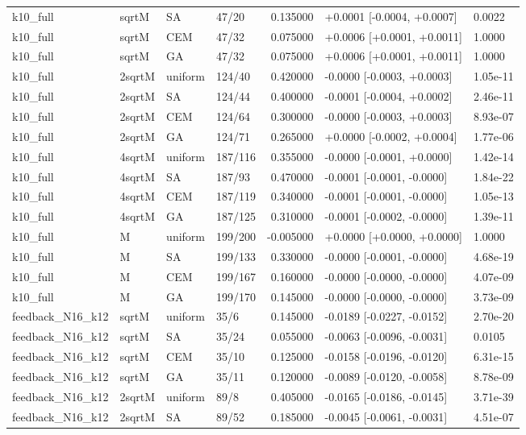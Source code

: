 \begin{tabular}{llllrll}
k10\_full & sqrtM & SA & 47/20 & 0.135000 & +0.0001 [-0.0004, +0.0007] & 0.0022 \\
k10\_full & sqrtM & CEM & 47/32 & 0.075000 & +0.0006 [+0.0001, +0.0011] & 1.0000 \\
k10\_full & sqrtM & GA & 47/32 & 0.075000 & +0.0006 [+0.0001, +0.0011] & 1.0000 \\
k10\_full & 2sqrtM & uniform & 124/40 & 0.420000 & -0.0000 [-0.0003, +0.0003] & 1.05e-11 \\
k10\_full & 2sqrtM & SA & 124/44 & 0.400000 & -0.0001 [-0.0004, +0.0002] & 2.46e-11 \\
k10\_full & 2sqrtM & CEM & 124/64 & 0.300000 & -0.0000 [-0.0003, +0.0003] & 8.93e-07 \\
k10\_full & 2sqrtM & GA & 124/71 & 0.265000 & +0.0000 [-0.0002, +0.0004] & 1.77e-06 \\
k10\_full & 4sqrtM & uniform & 187/116 & 0.355000 & -0.0000 [-0.0001, +0.0000] & 1.42e-14 \\
k10\_full & 4sqrtM & SA & 187/93 & 0.470000 & -0.0001 [-0.0001, -0.0000] & 1.84e-22 \\
k10\_full & 4sqrtM & CEM & 187/119 & 0.340000 & -0.0001 [-0.0001, -0.0000] & 1.05e-13 \\
k10\_full & 4sqrtM & GA & 187/125 & 0.310000 & -0.0001 [-0.0002, -0.0000] & 1.39e-11 \\
k10\_full & M & uniform & 199/200 & -0.005000 & +0.0000 [+0.0000, +0.0000] & 1.0000 \\
k10\_full & M & SA & 199/133 & 0.330000 & -0.0000 [-0.0001, -0.0000] & 4.68e-19 \\
k10\_full & M & CEM & 199/167 & 0.160000 & -0.0000 [-0.0000, -0.0000] & 4.07e-09 \\
k10\_full & M & GA & 199/170 & 0.145000 & -0.0000 [-0.0000, -0.0000] & 3.73e-09 \\
feedback\_N16\_k12 & sqrtM & uniform & 35/6 & 0.145000 & -0.0189 [-0.0227, -0.0152] & 2.70e-20 \\
feedback\_N16\_k12 & sqrtM & SA & 35/24 & 0.055000 & -0.0063 [-0.0096, -0.0031] & 0.0105 \\
feedback\_N16\_k12 & sqrtM & CEM & 35/10 & 0.125000 & -0.0158 [-0.0196, -0.0120] & 6.31e-15 \\
feedback\_N16\_k12 & sqrtM & GA & 35/11 & 0.120000 & -0.0089 [-0.0120, -0.0058] & 8.78e-09 \\
feedback\_N16\_k12 & 2sqrtM & uniform & 89/8 & 0.405000 & -0.0165 [-0.0186, -0.0145] & 3.71e-39 \\
feedback\_N16\_k12 & 2sqrtM & SA & 89/52 & 0.185000 & -0.0045 [-0.0061, -0.0031] & 4.51e-07 \\

\end{tabular}
